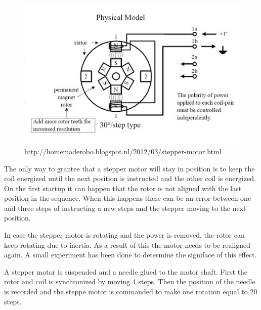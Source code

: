 \begin{figure}
	\centering
	\includegraphics[width=\textwidth]{"pics/bipolar_stepper"}
	\caption{http://homemaderobo.blogspot.nl/2012/03/stepper-motor.html}
	\label{fig:bipolarstepper}
\end{figure}

The only way to grantee that a stepper motor will stay in position is to keep the coil energized until the next position is instructed and the other coil is energized. 
On the first startup it can happen that the rotor is not aligned with the last position in the sequence.
When this happens there can be an error between one and three steps of instructing a new steps and the stepper moving to the next position.

In case the stepper motor is rotating and the power is removed, the rotor can keep rotating due to inertia.
As a result of this the motor needs to be realigned again.
A small experiment has been done to determine the signiface of this effect.

A stepper motor is suspended and a needle glued to the motor shaft.
First the rotor and coil is synchronized by moving 4 steps.
Then the position of the needle is recorded and the steppe motor is commanded to make one rotation equal to 20 steps.

